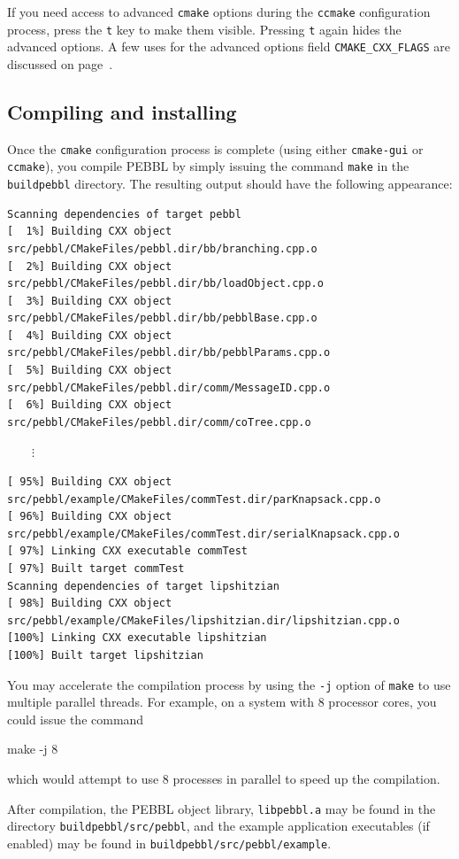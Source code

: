 If you need access to advanced \texttt{cmake} options during the
\texttt{ccmake} configuration process, press the \texttt{t} key to make them
visible.  Pressing \texttt{t} again hides the advanced options.  A few uses
for the advanced options field \texttt{CMAKE\_CXX\_FLAGS} are discussed on
page~\pageref{advancedoptions}.

\subsection{Compiling and installing}
Once the \texttt{cmake} configuration process is complete (using either
\texttt{cmake-gui} or \texttt{ccmake}), you compile PEBBL by simply issuing
the command \texttt{make} in the \texttt{buildpebbl} directory.  The resulting
output should have the following appearance:
{\footnotesize
\begin{verbatim}
Scanning dependencies of target pebbl
[  1%] Building CXX object src/pebbl/CMakeFiles/pebbl.dir/bb/branching.cpp.o
[  2%] Building CXX object src/pebbl/CMakeFiles/pebbl.dir/bb/loadObject.cpp.o
[  3%] Building CXX object src/pebbl/CMakeFiles/pebbl.dir/bb/pebblBase.cpp.o
[  4%] Building CXX object src/pebbl/CMakeFiles/pebbl.dir/bb/pebblParams.cpp.o
[  5%] Building CXX object src/pebbl/CMakeFiles/pebbl.dir/comm/MessageID.cpp.o
[  6%] Building CXX object src/pebbl/CMakeFiles/pebbl.dir/comm/coTree.cpp.o
\end{verbatim}
\vspace{-1.3ex}
$\qquad\vdots$
\begin{verbatim}
[ 95%] Building CXX object src/pebbl/example/CMakeFiles/commTest.dir/parKnapsack.cpp.o
[ 96%] Building CXX object src/pebbl/example/CMakeFiles/commTest.dir/serialKnapsack.cpp.o
[ 97%] Linking CXX executable commTest
[ 97%] Built target commTest
Scanning dependencies of target lipshitzian
[ 98%] Building CXX object src/pebbl/example/CMakeFiles/lipshitzian.dir/lipshitzian.cpp.o
[100%] Linking CXX executable lipshitzian
[100%] Built target lipshitzian
\end{verbatim}
}

You may accelerate the compilation process by using the \texttt{-j} option of
\texttt{make} to use multiple parallel threads.  For example, on a system with
8 processor cores, you could issue the command
\begin{codeblock}
make -j 8
\end{codeblock}
which would attempt to use 8 processes in parallel to speed up the compilation.

After compilation, the PEBBL object library, \texttt{libpebbl.a} may be found
in the directory \texttt{buildpebbl/src/pebbl}, and the example application
executables (if enabled) may be found in
\texttt{buildpebbl/src/pebbl/example}.

